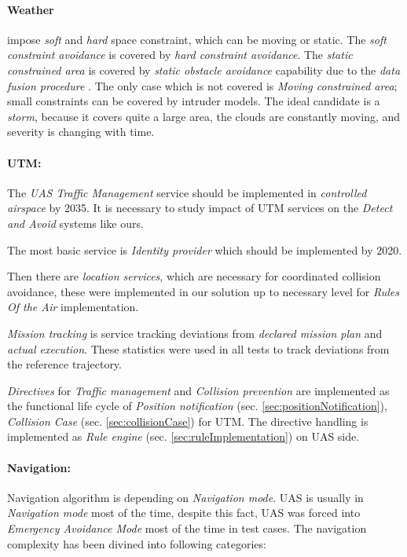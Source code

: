 \paragraph{Weather} impose  \emph{soft} and \emph{hard} space constraint, which can be moving or static. The \emph{soft constraint avoidance} is covered by \emph{hard constraint avoidance}. The \emph{static constrained area} is covered by \emph{static obstacle avoidance} capability due to the \emph{data fusion procedure} \cite{gomola2017probabilistic}. The only case which is not covered is \emph{Moving constrained area}; small constraints can be covered by intruder models. The ideal candidate is a \emph{storm}, because it covers quite a large area, the clouds are constantly moving, and severity is changing with time.



\paragraph{UTM:} The \emph{UAS Traffic Management} service should be implemented in \emph{controlled airspace} by 2035. It is necessary to study impact of UTM services on the \emph{Detect and Avoid} systems like ours. 

The most basic service is \emph{Identity provider} which should be implemented by 2020. 

Then there are \emph{location services}, which are necessary for coordinated collision avoidance, these were implemented in our solution up to necessary level for \emph{Rules Of the Air} implementation.

\noindent \emph{Mission tracking} is service tracking deviations from \emph{declared mission plan} and \emph{actual execution}. These statistics were used in all tests to track deviations from the reference trajectory.

\emph{Directives} for \emph{Traffic management} and \emph{Collision prevention} are implemented  as the functional life cycle of  \emph{Position notification} (sec. \ref{sec:positionNotification}), \emph{Collision Case} (sec. \ref{sec:collisionCase}) for UTM. The directive handling is implemented as \emph{Rule engine} (sec. \ref{sec:ruleImplementation}) on UAS side.
\newpage
\paragraph{Navigation:} Navigation algorithm is depending on \emph{Navigation mode}. UAS is usually in \emph{Navigation mode} most of the time, despite this fact, UAS was forced into \emph{Emergency Avoidance Mode} most of the time in test cases. The navigation complexity has been divined into following categories:

